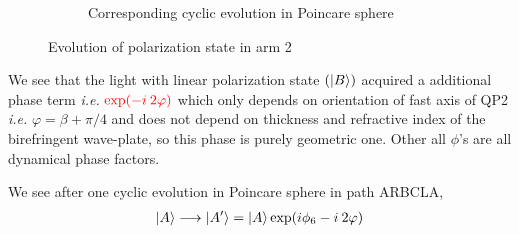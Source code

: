 \documentclass[11pt,a4paper]{article}
\numberwithin{equation}{section}
\begin{document}
\begin{figure}[t]
\begin{subfigure}[H]{0.4\textwidth}
		\caption{Corresponding cyclic evolution in Poincare sphere}
		\label{fig:pancha b}
	\end{subfigure}
	\caption{Evolution of polarization state in arm 2}
	\label{fig:pancha}
\end{figure}


We see that the light with linear polarization state $(\ket{B})$ acquired a additional phase term \textit{i.e.} ${\color{red}\exp(-i\:2\varphi)}$ which only depends on orientation of fast axis of QP2 \textit{i.e.} $\varphi= \beta+\pi/4$ and does not depend on thickness and refractive index of the birefringent wave-plate, so this phase is purely geometric one. Other all $\phi$'s are all dynamical phase factors. \cite{WO}

We see after one cyclic evolution in Poincare sphere in path ARBCLA,
\begin{align}
	\ket{A}\longrightarrow\ket{A'}=\ket{A}\exp(i\phi_6-i\:2\varphi)
\end{align}
\end{document}
